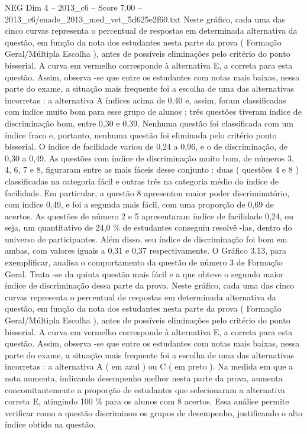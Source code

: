 \begin{textsample}{NEG Dim 4 – 2013\_c6 – Score 7.00 – 2013\_c6/enade\_2013\_med\_vet\_5d625e2f60.txt}
Neste gráfico, cada uma das cinco curvas representa o percentual de respostas em determinada alternativa da questão, em função da nota dos estudantes nesta parte da prova ( Formação Geral/Múltipla Escolha ), antes de possíveis eliminações pelo critério do ponto bisserial.
A curva em vermelho corresponde à alternativa E, a correta para esta questão.
Assim, observa -se que entre os estudantes com notas mais baixas, nessa parte do exame, a situação mais frequente foi a escolha de uma das alternativas incorretas : a alternativa A índices acima de 0,40 e, assim, foram classificadas com índice muito bom para esse grupo de alunos ; três questões tiveram índice de discriminação bom, entre 0,30 e 0,39.
Nenhuma questão foi classificada com um índice fraco e, portanto, nenhuma questão foi eliminada pelo critério ponto bisserial.
O índice de facilidade variou de 0,24 a 0,96, e o de discriminação, de 0,30 a 0,49.
As questões com índice de discriminação muito bom, de números 3, 4, 6, 7 e 8, figuraram entre as mais fáceis desse conjunto : duas ( questões 4 e 8 ) classificadas na categoria fácil e outras três na categoria médio do índice de facilidade.
Em particular, a questão 8 apresentou maior poder discriminatório, com índice 0,49, e foi a segunda mais fácil, com uma proporção de 0,69 de acertos.
As questões de número 2 e 5 apresentaram índice de facilidade 0,24, ou seja, um quantitativo de 24,0 \% de estudantes conseguiu resolvê -las, dentro do universo de participantes.
Além disso, seu índice de discriminação foi bom em ambas, com valores iguais a 0,31 e 0,37 respectivamente.
O Gráfico 3.13, para exemplificar, analisa o comportamento da questão de número 3 de Formação Geral.
Trata -se da quinta questão mais fácil e a que obteve o segundo maior índice de discriminação dessa parte da prova.
Neste gráfico, cada uma das cinco curvas representa o percentual de respostas em determinada alternativa da questão, em função da nota dos estudantes nesta parte da prova ( Formação Geral/Múltipla Escolha ), antes de possíveis eliminações pelo critério do ponto bisserial.
A curva em vermelho corresponde à alternativa E, a correta para esta questão.
Assim, observa -se que entre os estudantes com notas mais baixas, nessa parte do exame, a situação mais frequente foi a escolha de uma das alternativas incorretas : a alternativa A ( em azul ) ou C ( em preto ).
Na medida em que a nota aumenta, indicando desempenho melhor nesta parte da prova, aumenta concomitantemente a proporção de estudantes que selecionaram a alternativa correta E, atingindo 100 \% para os alunos com 8 acertos.
Essa análise permite verificar como a questão discriminou os grupos de desempenho, justificando o alto índice obtido na questão.

\end{textsample}
